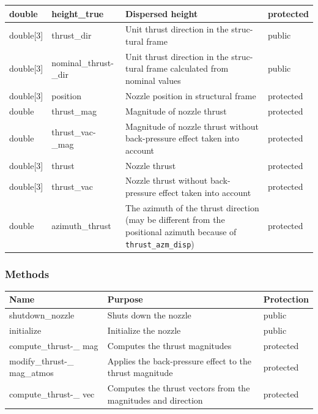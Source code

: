 \documentclass[11pt,fleqn]{report}
\begin{document}
\begin{center}
\begin{longtable}{|p{2.75cm}|p{2.8cm}|p{7.1cm}|l|}
double & height\_true & Dispersed height & protected \\
\hline
double[3] & thrust\_dir & Unit thrust direction in the struc-\newline tural frame & public \\
\hline
double[3] & nominal\_thrust-\newline \_dir & Unit thrust direction in the struc-\newline tural frame calculated from nominal values & public \\
\hline
double[3] & position & Nozzle position in structural frame & protected \\
\hline
double & thrust\_mag & Magnitude of nozzle thrust & protected \\
\hline
double & thrust\_vac-\newline \_mag & Magnitude of nozzle thrust without back-pressure effect taken into account & protected \\
\hline
double[3] & thrust & Nozzle thrust & protected \\
\hline
double[3] & thrust\_vac & Nozzle thrust without back-pressure effect taken into account & protected \\
\hline
double & azimuth\_thrust & The azimuth of the thrust direction (may be different from the positional azimuth because of \verb|thrust_azm_disp|) & protected \\
\hline
\end{longtable}
\end{center}

\subsubsection{Methods}
\begin{center}
\begin{tabular}{|p{3cm}|p{10cm}|l|} \hline
\textbf{Name} & \textbf{Purpose} & \textbf{Protection} \\
\hline
shutdown\_nozzle & Shuts down the nozzle & public \\
\hline
initialize & Initialize the nozzle & public \\
\hline
compute\_thrust-\newline \_ mag & Computes the thrust magnitudes & protected \\
\hline
modify\_thrust-\newline \_ mag\_atmos & Applies the back-pressure effect to the thrust magnitude & protected \\
\hline
compute\_thrust-\newline \_ vec & Computes the thrust vectors from the magnitudes and direction & protected \\
\hline
\end{tabular}
\end{center}
\end{document}
